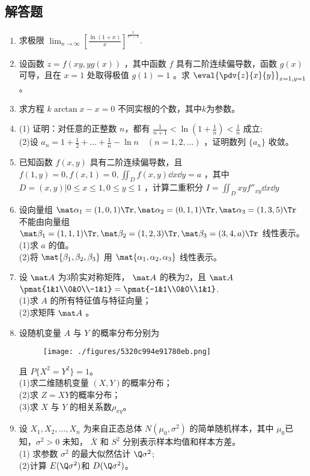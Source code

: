 \subsection{解答题}
\begin{enumerate}
\item 求极限  $\displaystyle \lim_{n\to\infty}[\frac{\ln (1+x)}{x}]^{\frac{1}{e^x-1}}$.
\item 设函数 $z=f(xy,yg(x))$ ，其中函数 $f$ 具有二阶连续偏导数，函数 $g(x)$ 可导，且在 $x=1$ 处取得极值 $g(1)=1$ 。求 $\displaystyle \eval{\pdv{z}{x}{y}}_{x=1,y=1}$。
\item 求方程 $k\arctan x -x=0$ 不同实根的个数，其中$ k$为参数。
\item (1) 证明：对任意的正整数 $n$，都有 $\frac{1}{n+1}<\ln(1+\frac{1}{n})<\frac{1}{n}$ 成立;\\
(2)设 $\displaystyle a_n=1+\frac{1}{2}+\dots+\frac{1}{n}-\ln n\quad (n=1,2,\dots )$  ，证明数列 $\{a_n\}$ 收敛。
\item 已知函数 $f(x,y)$ 具有二阶连续偏导数，且 $f(1,y)=0,f(x,1)=0,\iint_D f(x,y)\dd{x}\dd{y}=a$  ，其中 $D={(x,y)|0\le x \le 1,0 \le y \le 1}$ ，计算二重积分 $\displaystyle I=\iint_D xyf''_{xy}\dd{x}\dd{y}$
\item 设向量组  $\mat \alpha_1=(1,0,1) \Tr,\mat \alpha_2=(0,1,1)\Tr,\mat \alpha_3=(1,3,5)\Tr$  不能由向量组 $ \mat \beta_1=(1,1,1) \Tr,\mat \beta_2=(1,2,3) \Tr,\mat \beta_3=(3,4,a) \Tr$ 线性表示。\\
(1)求 $a$ 的值。\\
(2)将 $\mat {\beta_1,\beta_2,\beta_3}$ 用 $\mat {\alpha_1,\alpha_2,\alpha_3}$ 线性表示。
\item 设 $\mat A$ 为3阶实对称矩阵， $\mat A$  的秩为2，且 $\mat A$ $\pmat{1&1\\0&0\\-1&1}=\pmat{-1&1\\0&0\\1&1}$.\\
(1)求 $A$ 的所有特征值与特征向量；\\
(2)求矩阵  $\mat A$ 。
\item 设随机变量 $A$ 与 $Y$ 的概率分布分别为\begin{figure}[ht]
\centering
\texttt{[image: ./figures/5320c994e91780eb.png]}
\caption{} \label{fig_PeeM11_1}
\end{figure}
且 $P\{X^2=Y^2\}=1$。\\
(1)求二维随机变量 $(X,Y)$的概率分布；\\
(2)求 $Z=XY$的概率分布；\\
(3)求 $X$ 与 $Y$ 的相关系数$\rho_{xy}$。
\item 设 $X_1,X_2,\dots,X_n$ 为来自正态总体 $N(\mu_0,\sigma^2)$ 的简单随机样本，其中  $\mu_0$已知，$\sigma^2>0$  未知， $\bar X$   和 $S^2$ 分别表示样本均值和样本方差。\\
(1) 求参数 $\sigma^2$ 的最大似然估计 $\Q \sigma^2$;\\
(2)计算 $E(\Q \sigma^2)$和  $D(\Q \sigma^2)$。
\end{enumerate}